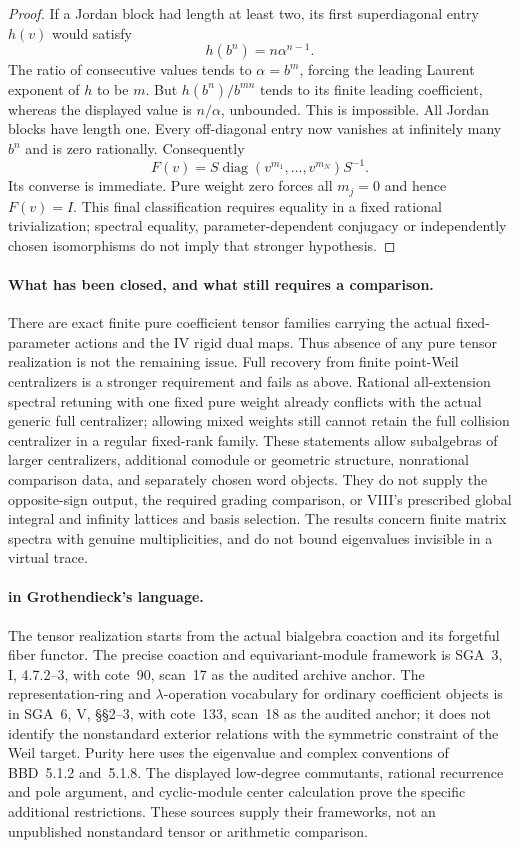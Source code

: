 \begin{proof}
If a Jordan block had length at least two, its first
superdiagonal entry $h(v)$ would satisfy
\[
 h(b^n)=n\alpha^{n-1}.
\]
The ratio of consecutive values tends to
$\alpha=b^m$, forcing the leading Laurent exponent
of $h$ to be $m$.
But $h(b^n)/b^{mn}$ tends to its finite leading
coefficient, whereas the displayed value is
$n/\alpha$, unbounded. This is impossible.
All Jordan blocks have length one.
Every off-diagonal entry now vanishes at infinitely
many $b^n$ and is zero rationally.
Consequently
\[
 F(v)=S\operatorname{diag}(v^{m_1},\ldots,v^{m_N})S^{-1}.
\]
Its converse is immediate. Pure weight zero forces
all $m_j=0$ and hence $F(v)=I$.
This final classification requires equality in a
fixed rational trivialization; spectral equality,
parameter-dependent conjugacy or independently chosen
isomorphisms do not imply that stronger hypothesis.
\end{proof}

\paragraph{What has been closed, and what still requires a comparison.}
There are exact finite pure coefficient tensor families
carrying the actual fixed-parameter actions and the IV
rigid dual maps. Thus absence of any pure tensor realization
is not the remaining issue.
Full recovery from finite point-Weil centralizers is a
stronger requirement and fails as above.
Rational all-extension spectral retuning with one fixed
pure weight already conflicts with the actual generic
full centralizer; allowing mixed weights still cannot
retain the full collision centralizer in a regular
fixed-rank family.
These statements allow subalgebras of larger centralizers,
additional comodule or geometric structure, nonrational
comparison data, and separately chosen word objects.
They do not supply the  opposite-sign output,
the required grading comparison, or VIII's prescribed
global integral and infinity lattices and basis selection.
The results concern finite matrix spectra with genuine
multiplicities, and do not bound eigenvalues invisible
in a virtual trace.

\paragraph{ in Grothendieck's language.}
The tensor realization starts from the actual bialgebra
coaction and its forgetful fiber functor. The precise
coaction and equivariant-module framework is SGA~3,
I, 4.7.2--3, with cote~90, scan~17 as the audited archive
anchor. The representation-ring and $\lambda$-operation
vocabulary for ordinary coefficient objects is in
SGA~6, V, \S\S2--3, with cote~133, scan~18 as the audited anchor;
it does not identify the nonstandard exterior relations
with the symmetric constraint of the Weil target.
Purity here uses the eigenvalue and complex conventions
of BBD~5.1.2 and~5.1.8.
The displayed low-degree commutants, rational recurrence
and pole argument, and cyclic-module center calculation
prove the specific additional restrictions.
These sources supply their frameworks, not an unpublished
nonstandard tensor or arithmetic comparison.
